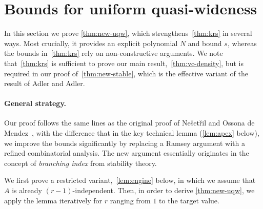 \section{Bounds for uniform quasi-wideness}\label{sec:uqw}



In this section we prove \cref{thm:new-uqw},
which strengthens~\cref{thm:krs} in several ways. Most crucially, 
it provides an explicit polynomial $N$ and bound $s$,
whereas the bounds in~\cref{thm:krs} rely on non-constructive arguments. We note that~\cref{thm:krs} is sufficient to prove our main result,~\cref{thm:vc-density}, but is required in our proof of~\cref{thm:new-stable}, which is the effective 
variant of the result of Adler and Adler.




%



\paragraph{General strategy.}
Our proof follows the same lines as the original proof of Ne\v set\v ril and Ossona de Mendez~\cite{nevsetvril2011nowhere}, with the difference that in the key technical lemma (\cref{lem:apex} below), 
we improve the bounds significantly by replacing a Ramsey argument with a refined combinatorial analysis.
The new argument essentially originates in the concept of {\em{branching index}} from stability theory. 

We first prove a restricted variant,~\cref{lem:engine} below, in which we assume that $A$ is already $(r-1)$-independent. Then, in order to derive
\cref{thm:new-uqw}, we apply the lemma iteratively for $r$ ranging from $1$ to the target value.

